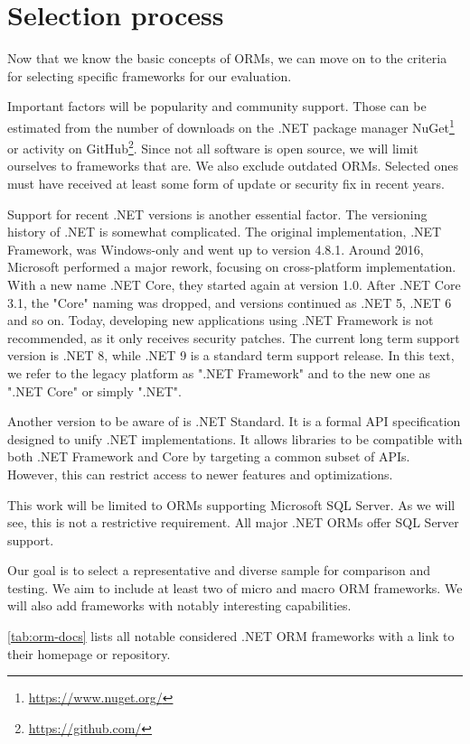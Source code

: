 \section{Selection process}
Now that we know the basic concepts of ORMs, we can move on to the criteria for selecting specific frameworks for our evaluation.

Important factors will be popularity and community support. Those can be estimated from the number of downloads on the .NET package manager NuGet\footnote{\url{https://www.nuget.org/}} or activity on GitHub\footnote{\url{https://github.com/}}. Since not all software is open source, we will limit ourselves to frameworks that are. We also  exclude outdated ORMs. Selected ones must have received at least some form of update or security fix in recent years.

Support for recent .NET versions is another essential factor. The versioning history of .NET is somewhat complicated. The original implementation, .NET Framework, was Windows-only and went up to version 4.8.1. Around 2016, Microsoft performed a major rework, focusing on cross-platform implementation. With a new name .NET Core, they started again at version 1.0. After .NET Core 3.1, the "Core" naming was dropped, and versions continued as .NET 5, .NET 6 and so on. Today, developing new applications using .NET Framework is not recommended, as it only receives security patches. The current long term support version is .NET 8, while .NET 9 is a standard term support release. In this text, we refer to the legacy platform as ".NET Framework" and to the new one as ".NET Core" or simply ".NET". \cite{NETFrameworkVersions}\cite{NETversions}

Another version to be aware of is .NET Standard. It is a formal API specification designed to unify .NET implementations. It allows libraries to be compatible with both .NET Framework and Core by targeting a common subset of APIs. However, this can restrict access to newer features and optimizations. \cite{NETStandard}

This work will be limited to ORMs supporting Microsoft SQL Server. As we will see, this is not a restrictive requirement. All major .NET ORMs offer SQL Server support.

Our goal is to select a representative and diverse sample for comparison and testing. We aim to include at least two of micro and macro ORM frameworks. We will also add frameworks with notably interesting capabilities.

\autoref{tab:orm-docs} lists all notable considered .NET ORM frameworks with a link to their homepage or repository.

